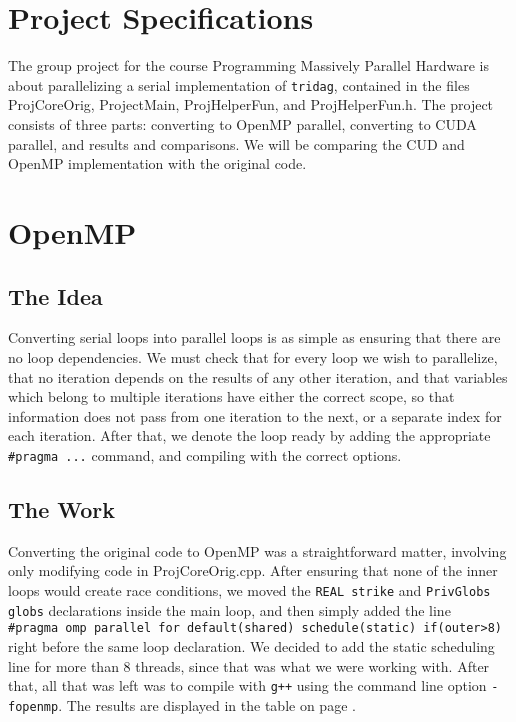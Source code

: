 \documentclass[]{report}
\title{}
\author{}
\begin{document}
\section{Project Specifications}
The group project for the course Programming Massively Parallel Hardware is about parallelizing a serial implementation of \texttt{tridag}, contained in the files ProjCoreOrig, ProjectMain, ProjHelperFun, and ProjHelperFun.h. The project consists of three parts: converting to OpenMP parallel, converting to CUDA parallel, and results and comparisons. We will be comparing the CUD and OpenMP implementation with the original code.
\section{OpenMP}
\subsection{The Idea}
Converting serial loops into parallel loops is as simple as ensuring that there are no loop dependencies. We must check that for every loop we wish to parallelize, that no iteration depends on the results of any other iteration, and that variables which belong to multiple iterations have either the correct scope, so that information does not pass from one iteration to the next, or a separate index for each iteration. After that, we denote the loop ready by adding the appropriate \texttt{\#pragma ...} command, and compiling with the correct options.
\subsection{The Work}
Converting the original code to OpenMP was a straightforward matter, involving only modifying code in ProjCoreOrig.cpp. After ensuring that none of the inner loops would create race conditions, we moved the \texttt{REAL strike} and \texttt{PrivGlobs globs} declarations inside the main loop, and then simply added the line\\
\texttt{\#pragma omp parallel for default(shared) schedule(static) if(outer>8)} right before the same loop declaration. We decided to add the static scheduling line for more than 8 threads, since that was what we were working with. After that, all that was left was to compile with \texttt{g++} using the command line option \texttt{-fopenmp}. The results are displayed in the table on page \pageref{fig:results}.
\end{document}
